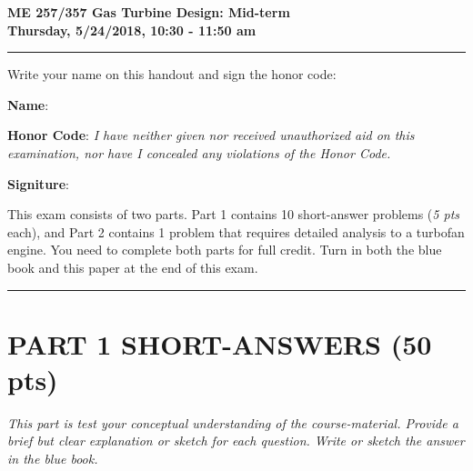 \documentclass[11pt]{article}
\begin{document}
\begin{center}
{\Large\bf ME 257/357 Gas Turbine Design: Mid-term\\
       Thursday, 5/24/2018, 10:30 - 11:50 am}
\end{center}

\hrule
\vspace{2mm}
\noindent Write your name on this handout and sign the honor code:

\vspace{6mm}
\noindent \textbf{Name}: \dotfill %
\vspace{2mm}

\noindent \textbf{Honor Code}: \emph{I have neither given nor received unauthorized aid on this examination, nor have I concealed any violations of the Honor Code.}

\vspace{6mm}
\noindent \textbf{Signiture}: \dotfill %

\vspace{2mm}
\noindent This exam consists of two parts. Part 1 contains 10 short-answer problems (\emph{5 pts} each), and Part 2 contains 1 problem that requires detailed analysis to a turbofan engine. You need to complete both parts for full credit. Turn in both the blue book and this paper at the end of this exam.

\vspace{2mm}
\hrule

\vspace{2mm}

\section*{\textbf{PART 1} SHORT-ANSWERS (50 pts)} %
\label{sec:_textbf_part_1_short_answers}
\noindent \emph{This part is test your conceptual understanding of the course-material. Provide a brief but clear explanation or sketch for each question. Write or sketch the answer in the blue book.}
\end{document}
